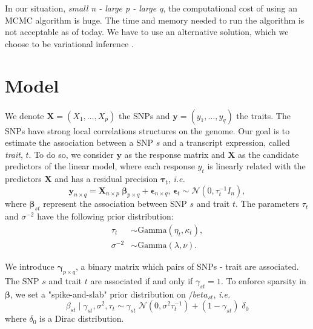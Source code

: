 \documentclass{article}
\numberwithin{equation}{section}
\begin{document}
In our situation, \textit{small n - large p - large q}, the computational cost of using an MCMC algorithm is huge. The time and memory needed to run the algorithm is not acceptable as of today. We have to use an alternative solution, which we choose to be variational inference \cite{varInf}.
\newpage
\section{Model}
We denote $\boldsymbol{X }= (X_1,\ldots,X_p)$ the SNPs and $\boldsymbol{y} = (y_1,\ldots,y_q)$ the traits. The SNPs have strong local correlations structures on the genome. Our goal is to estimate the association between a SNP $s$ and a transcript expression, called \textit{trait}, $t$. To do so, we consider $\boldsymbol{y}$ as the response matrix and $\boldsymbol{X}$ as the candidate predictors of the linear model, where each response $y_t$ is linearly related with the predictors $\boldsymbol{X}$ and has a residual precision $\boldsymbol{\tau}_t$, \textit{i.e.}
\begin{equation*}
\label{eq:model}
\boldsymbol{y}_{n\times q} = \boldsymbol{X}_{n \times p}\;\boldsymbol{\beta}_{p \times q}+\boldsymbol{\epsilon}_{n \times q}\text{, }\boldsymbol{\epsilon}_t \sim \mathcal{N}(0,\tau_t^{-1}I_n),
\end{equation*}
where $\boldsymbol{\beta}_{st}$ represent the association between SNP $s$ and trait $t$. The parameters $\tau_t$ and $\sigma^{-2}$ have the following prior distribution:
\begin{align*}
\tau_t &\sim \text{Gamma}(\eta_t,\kappa_t),\\
\sigma^{-2} &\sim \text{Gamma}(\lambda,\nu).
\end{align*}

We introduce $\boldsymbol{\gamma}_{p\times q}$, a binary matrix which pairs of SNPs - trait are associated. The SNP $s$ and trait $t$ are associated if and only if $\gamma_{st} = 1$. To enforce sparsity in $\boldsymbol{\beta}$, we set a "spike-and-slab" prior distribution on $/beta_{st}$, \textit{i.e.} 
\begin{equation*}
\beta_{st} \mid \gamma_{st},\sigma^2, \tau_t \sim \gamma_{st}\;\mathcal{N}(0,\sigma^2\tau_t^{-1})+(1-\gamma_{st})\;\delta_0
\end{equation*}
where $\delta_0$ is a Dirac distribution.
\end{document}
